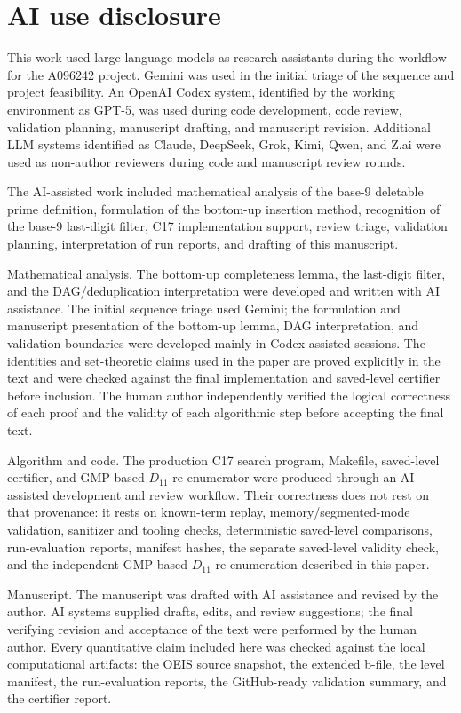\documentclass[11pt]{article}
\theoremstyle{definition}
\theoremstyle{remark}
\begin{document}
\section*{AI use disclosure}

This work used large language models as research assistants during the
workflow for the A096242 project.  Gemini was used in the initial triage of
the sequence and project feasibility.  An OpenAI Codex system, identified by
the working environment as GPT-5, was used during code development, code
review, validation planning, manuscript drafting, and manuscript revision.
Additional LLM systems identified as Claude, DeepSeek, Grok, Kimi, Qwen, and
Z.ai were used as non-author reviewers during code and manuscript review
rounds.

The AI-assisted work included mathematical analysis of the base-9 deletable
prime definition, formulation of the bottom-up insertion method, recognition
of the base-9 last-digit filter, C17 implementation support, review triage,
validation planning, interpretation of run reports, and drafting of this
manuscript.

Mathematical analysis.  The bottom-up completeness lemma, the last-digit
filter, and the DAG/deduplication interpretation were developed and written
with AI assistance.  The initial sequence triage used Gemini; the formulation
and manuscript presentation of the bottom-up lemma, DAG interpretation, and
validation boundaries were developed mainly in Codex-assisted sessions.  The
identities and set-theoretic claims used in the paper are proved explicitly
in the text and were checked against the final implementation and saved-level
certifier before inclusion.
The human author independently verified the logical correctness of each proof
and the validity of each algorithmic step before accepting the final text.

Algorithm and code.  The production C17 search program, Makefile,
saved-level certifier, and GMP-based \(D_{11}\) re-enumerator were produced
through an AI-assisted development and review workflow.  Their correctness
does not rest on that provenance: it rests on known-term replay,
memory/segmented-mode validation, sanitizer and tooling checks,
deterministic saved-level comparisons, run-evaluation reports, manifest
hashes, the separate saved-level validity check, and the independent
GMP-based \(D_{11}\) re-enumeration described in this paper.

Manuscript.  The manuscript was drafted with AI assistance and revised by the
author.  AI systems supplied drafts, edits, and review suggestions; the final
verifying revision and acceptance of the text were performed by the human
author.  Every quantitative claim included here was checked against the local
computational artifacts: the OEIS source snapshot, the extended b-file, the
level manifest, the run-evaluation reports, the GitHub-ready validation
summary, and the certifier report.
\end{document}
